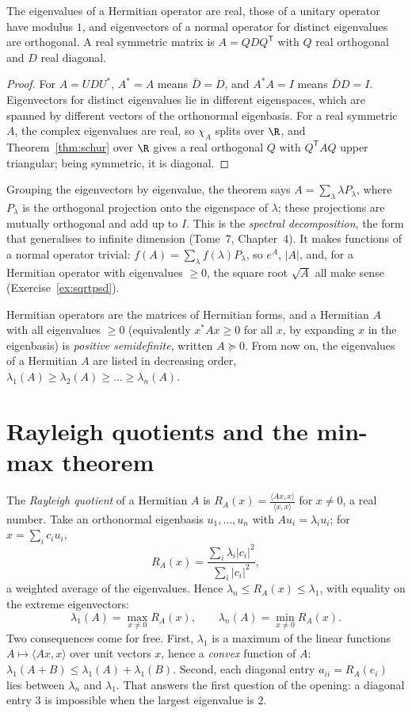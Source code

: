 \begin{corollary}\label{cor:hermitian}
The eigenvalues of a Hermitian operator are real, those of a unitary operator have modulus $1$, and eigenvectors of a
normal operator for distinct eigenvalues are orthogonal. A real symmetric matrix is $A=QDQ^{\mathsf T}$ with $Q$ real
orthogonal and $D$ real diagonal.
\end{corollary}
\begin{proof}
For $A=UDU^*$, $A^*=A$ means $\bar D=D$, and $A^*A=I$ means $\bar DD=I$. Eigenvectors for distinct eigenvalues lie in
different eigenspaces, which are spanned by different vectors of the orthonormal eigenbasis. For a real symmetric $A$, the
complex eigenvalues are real, so $\chi_A$ splits over $\R$, and Theorem~\ref{thm:schur} over $\R$ gives a real orthogonal
$Q$ with $Q^{\mathsf T}AQ$ upper triangular; being symmetric, it is diagonal.
\end{proof}

Grouping the eigenvectors by eigenvalue, the theorem says $A=\sum_\lambda\lambda P_\lambda$, where $P_\lambda$ is the
orthogonal projection onto the eigenspace of $\lambda$; these projections are mutually orthogonal and add up to $I$. This is
the \emph{spectral decomposition}, the form that generalises to infinite dimension (Tome~7, Chapter~4). It makes functions
of a normal operator trivial: $f(A)=\sum_\lambda f(\lambda)P_\lambda$, so $e^A$, $|A|$, and, for a Hermitian operator with
eigenvalues $\ge0$, the square root $\sqrt A$ all make sense (Exercise~\ref{ex:sqrtpsd}).

Hermitian operators are the matrices of Hermitian forms, and a Hermitian $A$ with all eigenvalues $\ge0$ (equivalently
$x^*Ax\ge0$ for all $x$, by expanding $x$ in the eigenbasis) is \emph{positive semidefinite}, written $A\succeq0$. From now
on, the eigenvalues of a Hermitian $A$ are listed in decreasing order, $\lambda_1(A)\ge\lambda_2(A)\ge\dots\ge\lambda_n(A)$.

\section{Rayleigh quotients and the min-max theorem}

The \emph{Rayleigh quotient} of a Hermitian $A$ is $R_A(x)=\frac{\langle Ax,x\rangle}{\langle x,x\rangle}$ for $x\ne0$, a real
number. Take an orthonormal eigenbasis $u_1,\dots,u_n$ with $Au_i=\lambda_iu_i$; for $x=\sum_ic_iu_i$,
\begin{equation}\label{eq:rayleigh}
R_A(x)=\frac{\sum_i\lambda_i|c_i|^2}{\sum_i|c_i|^2},
\end{equation}
a weighted average of the eigenvalues. Hence $\lambda_n\le R_A(x)\le\lambda_1$, with equality on the extreme eigenvectors:
\[
\lambda_1(A)=\max_{x\ne0}R_A(x),\qquad\lambda_n(A)=\min_{x\ne0}R_A(x).
\]
Two consequences come for free. First, $\lambda_1$ is a maximum of the linear functions $A\mapsto\langle Ax,x\rangle$ over unit
vectors $x$, hence a \emph{convex} function of $A$: $\lambda_1(A+B)\le\lambda_1(A)+\lambda_1(B)$. Second, each diagonal entry
$a_{ii}=R_A(e_i)$ lies between $\lambda_n$ and $\lambda_1$. That answers the first question of the opening: a diagonal entry
$3$ is impossible when the largest eigenvalue is $2$.

